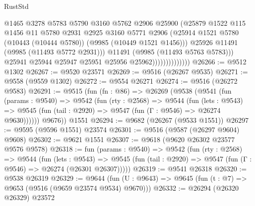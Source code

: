 \begin{lexlean}{RustStd}
\begin{coremodule}
                                  @1465
                                  @3278
                                  @5783
                                  @5790
                                  @3160
                                  @5762
                                  @2906
                                  @25900
                                  (@25879
                                    @1522
                                    @115
                                    @1456
                                    @11
                                    @5780
                                    @2931
                                    @2925
                                    @3160
                                    @5771
                                    @2906
                                    (@25914
                                      @1521
                                      @5780
                                      (@10443 (@10444 @5780))
                                      (@9985 (@10449 @1521 @1456)))
                                    @25926
                                    @11491
                                    (@9985 (@11493 @5772 @2931)))
                                  @11491
                                  (@9985 (@11493 @5763 @5783)))
                                @25941
                                @25944
                                @25947
                                @25951
                                @25956
                                @25962))))))))))))))
@26266 := @9512 @1302
@26267 := @9520 @23571
@26269 := @9516 (@26267 @9535)
@26271 := @9558 (@9559 @1302)
@26272 := @9554 @26271
@26274 := @9516 (@26272 @9583)
@26291 := @9515
    (fun (fn : @86) =>
    @26269
      (@9538
        (@9541
          (fun (params : @9540) =>
          @9542
            (fun (rty : @2568) =>
            @9544
              (fun (lets : @9543) =>
              @9545 (fun (tail : @2920) => @9547 (fun (Γ : @9546) => @26274 @9630))))))
        @9676))
    @1551
@26294 := @9682 (@26267 (@9533 @1551))
@26297 := @9595 (@9596 @1551) @23574
@26301 := @9516 (@9587 (@26297 @9604) @9608)
@26302 := @9621 @1551
@26307 := @9618 (@9620 @26302 @23577 @9576 @9578)
@26318 := fun (params : @9540) =>
  @9542
    (fun (rty : @2568) =>
    @9544
      (fun (lets : @9543) =>
      @9545 (fun (tail : @2920) => @9547 (fun (Γ : @9546) => @26274 (@26301 @26307)))))
@26319 := @9541 @26318
@26320 := @9538 @26319
@26329 := @9644
    (fun (U : @9643) => @9645 (fun (t : @7) => @9653 (@9516 (@9659 @23574 @9534) @9670)))
@26332 := @26294 (@26320 @26329) @23572

\end{coremodule}
\end{lexlean}
